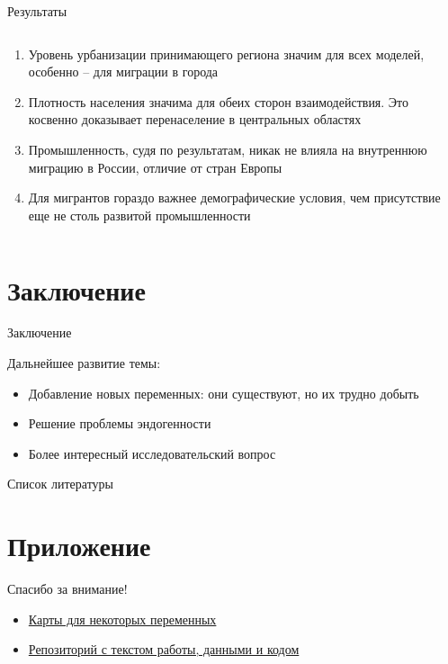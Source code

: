 \documentclass[aspectratio=169]{beamer}
\begin{document}
\begin{frame}{Результаты}
	
\begin{columns}
	\begin{column}{0.58\textwidth}
		\begin{enumerate}
			\small
			\item Уровень урбанизации принимающего региона значим для всех моделей, особенно -- для миграции в города
			\item Плотность населения значима для обеих сторон взаимодействия. Это косвенно доказывает перенаселение в центральных областях
			\item Промышленность, судя по результатам, никак не влияла на внутреннюю миграцию в России, отличие от стран Европы
			\item Для мигрантов гораздо важнее демографические условия, чем присутствие еще не столь развитой промышленности
		\end{enumerate}
	\end{column}
		
	\begin{column}{0.42\textwidth}
		\begin{tiny}
			
		\end{tiny}
	\end{column}
\end{columns}
	
\end{frame}


\section{Заключение}
\begin{frame}{Заключение}
	
Дальнейшее развитие темы:
	
\begin{itemize}
	\item Добавление новых переменных: они существуют, но их трудно добыть 
	\item Решение проблемы эндогенности
	\item Более интересный исследовательский вопрос
\end{itemize}

\end{frame}

\begin{frame}[shrink=20]{Список литературы}
    \printbibliography
\end{frame}

\section{Приложение}
\begin{frame}{Спасибо за внимание!}
    \begin{itemize}
	    \item \href{https://russia-migrations-1897.herokuapp.com}{Карты для некоторых переменных}
	    \item \href{https://github.com/fant0md/empire-migrations-coursework}{Репозиторий с текстом работы, данными и кодом}
    \end{itemize}
\end{frame}
\end{document}
